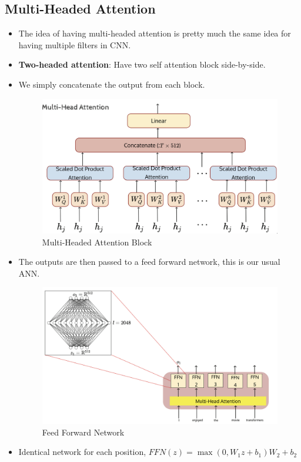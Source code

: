 \documentclass[a4paper]{article}
\begin{document}
\subsection{Multi-Headed Attention}
\begin{itemize}
    \item The idea of having multi-headed attention is pretty much the same idea for having multiple filters in CNN.
    \item \textbf{Two-headed attention}: Have two self attention block side-by-side.
    \item We simply concatenate the output from each block.
    \begin{figure}[H]
        \centering
        \includegraphics[width=0.8\linewidth]{Degree//static/DL_multi_head_attention.png}
        \caption{Multi-Headed Attention Block}
    \end{figure}
    \item The outputs are then passed to a feed forward network, this is our usual ANN.
    \begin{figure}[H]
        \centering
        \includegraphics[width=0.8\linewidth]{Degree//static/DL_feed_forward_network.png}
        \caption{Feed Forward Network}
    \end{figure}
    \item Identical network for each position, $FFN(z) = \max(0, W_1z + b_1)W_2 + b_2$

\end{itemize}
\end{document}
